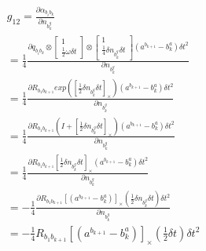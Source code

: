 \documentclass[UTF8]{ctexart}
\begin{document}
\begin{equation}
\begin{aligned}
&g_{12}=\frac{\partial \alpha_{b_ib_k}}{\partial n_{b_k^g}}\\
&=\frac{1}{4}\frac
{
    \partial q_{b_ib_k}\otimes 
    \begin{bmatrix}
        1\\
        \frac{1}{2}\omega\delta t
    \end{bmatrix}
    \otimes
    \begin{bmatrix}
        1\\
        \frac{1}{4}\delta n_{b_k^g} \delta t
    \end{bmatrix}  (a^{b_{k+1}}-b^a_k)\delta t^2
}{\partial n_{b_k^g}}\\
&=\frac{1}{4}\frac
{
    \partial R_{b_1b_{k+1}}exp([\frac{1}{2}\delta n_{b_k^g} \delta t]_\times)
    (a^{b_{k+1}}-b^a_k)\delta t^2 
}{\partial n_{b_k^g}}\\
&=\frac{1}{4}\frac
{
    \partial R_{b_1b_{k+1}}(I+[\frac{1}{2}\delta n_{b_k^g} \delta t]_\times)
    (a^{b_{k+1}}-b^a_k)\delta t^2 
}{\partial n_{b_k^g}}\\
&=\frac{1}{4}\frac
{
    \partial R_{b_1b_{k+1}}[\frac{1}{2}\delta n_{b_k^g} \delta t]_\times
    (a^{b_{k+1}}-b^a_k)\delta t^2 
}{\partial n_{b_k^g}}\\
&=-\frac{1}{4}\frac
{
    \partial R_{b_1b_{k+1}}[(a^{b_{k+1}}-b^a_k)]_\times(\frac{1}{2}\delta n_{b_k^g} \delta t)\delta t^2 
}{\partial n_{b_k^g}}\\
&=-\frac{1}{4}R_{b_1b_{k+1}}[(a^{b_{k+1}}-b^a_k)]_\times(\frac{1}{2} \delta t)\delta t^2 \\
\end{aligned}
\end{equation}
\end{document}
